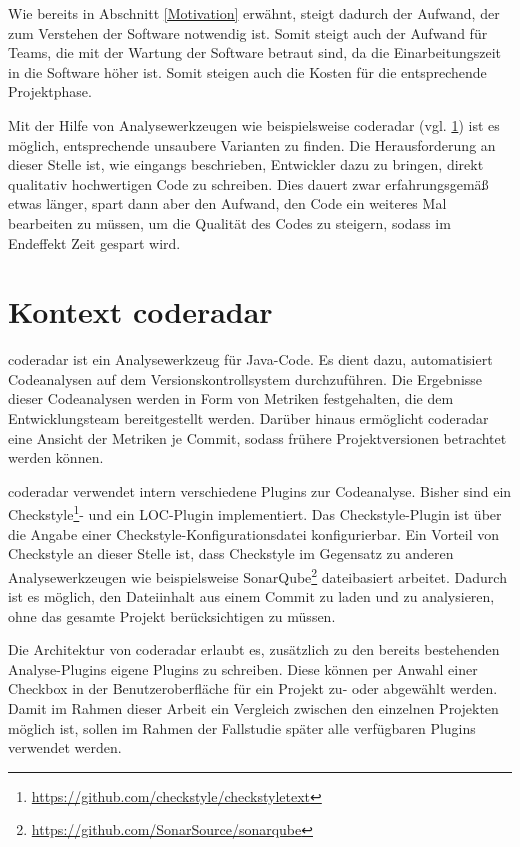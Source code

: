 \documentclass[
	oneside,  %
	ngerman, 
	final, 
	11pt, 
	a4paper, 
	1.1headlines, 
	headinclude=false, 
	footinclude=false, 
	mpinclude=false, 
	pagesize, 
	onecolumn, 
	titlepage, 
	parskip=half, 
	headsepline, 
	chapterprefix=false, 
	version=first, 
	listof=totoc, 
	bibliography=totoc, 
	toc=graduated, 
	fleqn
]{scrbook}
\begin{document}
Wie bereits in Abschnitt \ref{Motivation} erwähnt, steigt dadurch der Aufwand, der zum Verstehen der Software notwendig ist.
Somit steigt auch der Aufwand für Teams, die mit der Wartung der Software betraut sind, da die Einarbeitungszeit in die Software höher ist.
Somit steigen auch die Kosten für die entsprechende Projektphase.

Mit der Hilfe von Analysewerkzeugen wie beispielsweise coderadar (vgl. \ref{Kontext}) ist es möglich, entsprechende unsaubere Varianten zu finden.
Die Herausforderung an dieser Stelle ist, wie eingangs beschrieben, Entwickler dazu zu bringen, direkt qualitativ hochwertigen Code zu schreiben.
Dies dauert zwar erfahrungsgemäß etwas länger, spart dann aber den Aufwand, den Code ein weiteres Mal bearbeiten zu müssen, um die Qualität des Codes zu steigern, sodass im Endeffekt Zeit gespart wird.

\section{Kontext coderadar}
\label{Kontext}
coderadar ist ein Analysewerkzeug für Java-Code.
Es dient dazu, automatisiert Codeanalysen auf dem Versionskontrollsystem durchzuführen.
Die Ergebnisse dieser Codeanalysen werden in Form von Metriken festgehalten, die dem Entwicklungsteam bereitgestellt werden.
Darüber hinaus ermöglicht coderadar eine Ansicht der Metriken je Commit, sodass frühere Projektversionen betrachtet werden können.

coderadar verwendet intern verschiedene Plugins zur Codeanalyse.
Bisher sind ein Checkstyle\footnote{\url{https://github.com/checkstyle/checkstyletext}}- und ein \acf{LOC}-Plugin implementiert.
Das Checkstyle-Plugin ist über die Angabe einer Checkstyle-Konfigurationsdatei konfigurierbar.
Ein Vorteil von Checkstyle an dieser Stelle ist, dass Checkstyle im Gegensatz zu anderen Analysewerkzeugen wie beispielsweise SonarQube\footnote{\url{https://github.com/SonarSource/sonarqube}} dateibasiert arbeitet.
Dadurch ist es möglich, den Dateiinhalt aus einem Commit zu laden und zu analysieren, ohne das gesamte Projekt berücksichtigen zu müssen.

Die Architektur von coderadar erlaubt es, zusätzlich zu den bereits bestehenden Analyse-Plugins eigene Plugins zu schreiben.
Diese können per Anwahl einer Checkbox in der Benutzeroberfläche für ein Projekt zu- oder abgewählt werden.
Damit im Rahmen dieser Arbeit ein Vergleich zwischen den einzelnen Projekten möglich ist, sollen im Rahmen der Fallstudie später alle verfügbaren Plugins verwendet werden.
\end{document}
